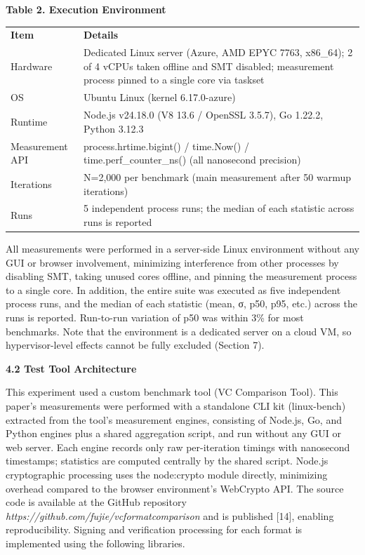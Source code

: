 \textbf{Table 2. Execution Environment}

\begin{longtable}[]{@{}ll@{}}
\toprule
\endhead
\textbf{Item} & \textbf{Details}\tabularnewline
Hardware & Dedicated Linux server (Azure, AMD EPYC 7763, x86\_64); 2 of 4 vCPUs taken offline and SMT disabled; measurement process pinned to a single core via taskset\tabularnewline
OS & Ubuntu Linux (kernel 6.17.0-azure)\tabularnewline
Runtime & Node.js v24.18.0 (V8 13.6 / OpenSSL 3.5.7), Go 1.22.2, Python 3.12.3\tabularnewline
Measurement API & process.hrtime.bigint() / time.Now() / time.perf\_counter\_ns() (all nanosecond precision)\tabularnewline
Iterations & N=2,000 per benchmark (main measurement after 50 warmup iterations)\tabularnewline
Runs & 5 independent process runs; the median of each statistic across runs is reported\tabularnewline
\bottomrule
\end{longtable}

All measurements were performed in a server-side Linux environment without any GUI or browser involvement, minimizing interference from other processes by disabling SMT, taking unused cores offline, and pinning the measurement process to a single core. In addition, the entire suite was executed as five independent process runs, and the median of each statistic (mean, σ, p50, p95, etc.) across the runs is reported. Run-to-run variation of p50 was within 3\% for most benchmarks. Note that the environment is a dedicated server on a cloud VM, so hypervisor-level effects cannot be fully excluded (Section 7).

\textbf{4.2 Test Tool Architecture}

This experiment used a custom benchmark tool (VC Comparison Tool). This paper's measurements were performed with a standalone CLI kit (linux-bench) extracted from the tool's measurement engines, consisting of Node.js, Go, and Python engines plus a shared aggregation script, and run without any GUI or web server. Each engine records only raw per-iteration timings with nanosecond timestamps; statistics are computed centrally by the shared script. Node.js cryptographic processing uses the node:crypto module directly, minimizing overhead compared to the browser environment's WebCrypto API. The source code is available at the GitHub repository \emph{https://github.com/fujie/vcformatcomparison} and is published {[}14{]}, enabling reproducibility. Signing and verification processing for each format is implemented using the following libraries.

